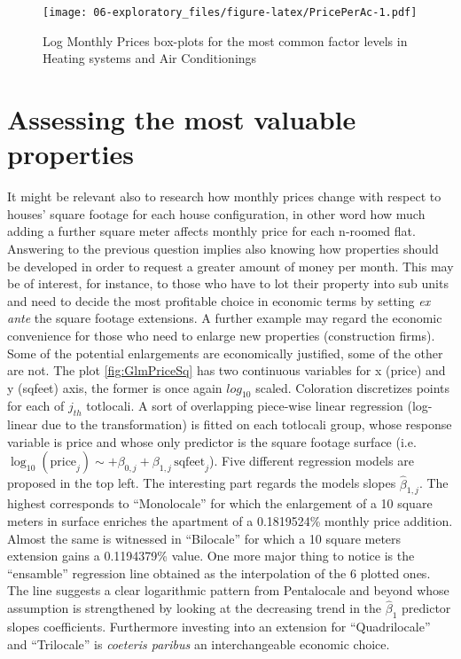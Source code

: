 \documentclass[
  12pt,
  a4paper,
  oneside]{book}
\theoremstyle{definition}
\theoremstyle{definition}
\theoremstyle{definition}
\theoremstyle{remark}
\begin{document}
\begin{figure}
\centering
\texttt{[image: 06-exploratory\_files/figure-latex/PricePerAc-1.pdf]}
\caption{\label{fig:PricePerAc}Log Monthly Prices box-plots for the most common factor levels in Heating systems and Air Conditionings}
\end{figure}

\hypertarget{assessing-the-most-valuable-properties}{%
\section{Assessing the most valuable properties}\label{assessing-the-most-valuable-properties}}

It might be relevant also to research how monthly prices change with respect to houses' square footage for each house configuration, in other word how much adding a further square meter affects monthly price for each n-roomed flat.
Answering to the previous question implies also knowing how properties should be developed in order to request a greater amount of money per month. This may be of interest, for instance, to those who have to lot their property into sub units and need to decide the most profitable choice in economic terms by setting \emph{ex ante} the square footage extensions.
A further example may regard the economic convenience for those who need to enlarge new properties (construction firms). Some of the potential enlargements are economically justified, some of the other are not.
The plot \ref{fig:GlmPriceSq} has two continuous variables for x (price) and y (sqfeet) axis, the former is once again \(log_{10}\) scaled. Coloration discretizes points for each of \(j_{th}\) totlocali. A sort of overlapping piece-wise linear regression (log-linear due to the transformation) is fitted on each totlocali group, whose response variable is price and whose only predictor is the square footage surface (i.e.~\(\log_{10}(\text{price}_j) \sim +\beta_{0,j}+\beta_{1,j}\, \text{sqfeet}_j\)). Five different regression models are proposed in the top left. The interesting part regards the models slopes \(\hat\beta_{1,j}\). The highest corresponds to ``Monolocale'' for which the enlargement of a 10 square meters in surface enriches the apartment of a 0.1819524\% monthly price addition. Almost the same is witnessed in ``Bilocale'' for which a 10 square meters extension gains a 0.1194379\% value. One more major thing to notice is the ``ensamble'' regression line obtained as the interpolation of the 6 plotted ones. The line suggests a clear logarithmic pattern from Pentalocale and beyond whose assumption is strengthened by looking at the decreasing trend in the \(\hat\beta_1\) predictor slopes coefficients. Furthermore investing into an extension for ``Quadrilocale'' and ``Trilocale'' is \emph{coeteris paribus} an interchangeable economic choice.
\end{document}
